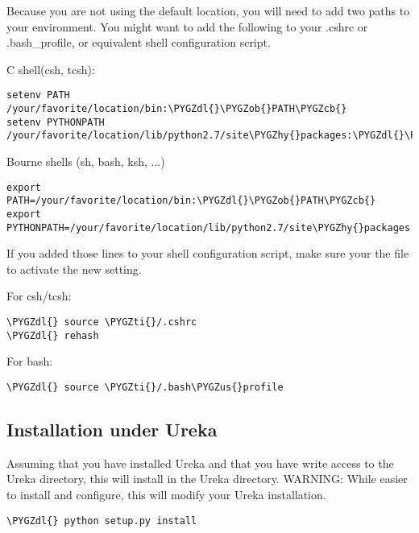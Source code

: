 \documentclass[letterpaper,10pt,english]{sphinxmanual}
\def\PYGZus{\char`\_}
\def\PYGZob{\char`\{}
\def\PYGZcb{\char`\}}
\def\PYGZdl{\char`\$}
\def\PYGZhy{\char`\-}
\def\PYGZti{\char`\~}
\begin{document}
Because you are not using the default location, you will need to add two paths to
your environment.  You might want to add the following to your .cshrc or
.bash\_profile, or equivalent shell configuration script.

C shell(csh, tcsh):

\begin{Verbatim}[commandchars=\\\{\}]
setenv PATH /your/favorite/location/bin:\PYGZdl{}\PYGZob{}PATH\PYGZcb{}
setenv PYTHONPATH /your/favorite/location/lib/python2.7/site\PYGZhy{}packages:\PYGZdl{}\PYGZob{}PYTHONPATH\PYGZcb{}
\end{Verbatim}

Bourne shells (sh, bash, ksh, ...)

\begin{Verbatim}[commandchars=\\\{\}]
export PATH=/your/favorite/location/bin:\PYGZdl{}\PYGZob{}PATH\PYGZcb{}
export PYTHONPATH=/your/favorite/location/lib/python2.7/site\PYGZhy{}packages:\PYGZdl{}\PYGZob{}PYTHONPATH\PYGZcb{}
\end{Verbatim}

If you added those lines to your shell configuration script, make sure your
 the file to activate the new setting.

For csh/tcsh:

\begin{Verbatim}[commandchars=\\\{\}]
\PYGZdl{} source \PYGZti{}/.cshrc
\PYGZdl{} rehash
\end{Verbatim}

For bash:

\begin{Verbatim}[commandchars=\\\{\}]
\PYGZdl{} source \PYGZti{}/.bash\PYGZus{}profile
\end{Verbatim}


\subsection{Installation under Ureka}
\label{userenv:installation-under-ureka}
Assuming that you have installed Ureka and that you have write access to the Ureka
directory, this will install  in the Ureka  directory.
WARNING: While easier to install and configure, this will modify your Ureka
installation.

\begin{Verbatim}[commandchars=\\\{\}]
\PYGZdl{} python setup.py install
\end{Verbatim}
\end{document}
